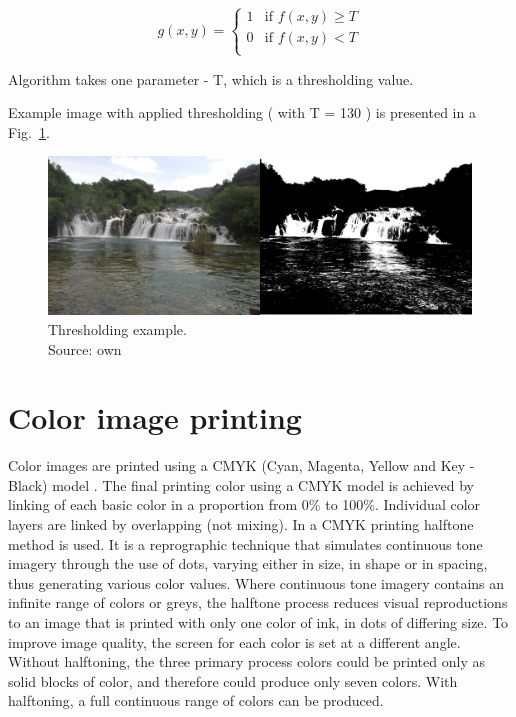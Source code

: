 \documentclass[a4paper,onecolumn,oneside,12pt]{memoir}
\begin{document}
$$
g(x, y) = \left\{ \begin{array}{ll}
1 & \textrm{if $f(x, y) \geq T$}\\
0 & \textrm{if $f(x, y) < T$}\\
\end{array} \right.
$$

Algorithm takes one parameter - T, which is a thresholding value.

Example image with applied thresholding ( with T = 130 ) is presented in a 
Fig.~\ref{thresholdingExample}.

\begin{figure}[ht]
\begin{center}
\includegraphics[scale=0.15]{images/thresholdingExample.jpg}
\caption{Thresholding example. \\
Source: own}
\label{thresholdingExample}
\end{center}
\end{figure}

\section{Color image printing}

Color images are printed using a CMYK (Cyan, Magenta, Yellow and Key - Black) model
\cite{cmykWiki,halftoneWiki}. The final printing color using a CMYK model is achieved by
linking of each basic color in a proportion from 0\% to 100\%. Individual color layers are linked by 
overlapping (not mixing). In a CMYK printing halftone method is used. It is a reprographic technique
that simulates continuous tone imagery through the use of dots, varying either in size, in shape or
in spacing, thus generating various color values. Where continuous tone imagery contains an
infinite range of colors or greys, the halftone process reduces visual reproductions to an image
that is printed with only one color of ink, in dots of differing size. To improve image quality, the
screen for each color is set at a different angle. Without halftoning, the three primary process
colors could be printed only as solid blocks of color, and therefore could produce only seven
colors. With halftoning, a full continuous range of colors can be produced.
\end{document}

